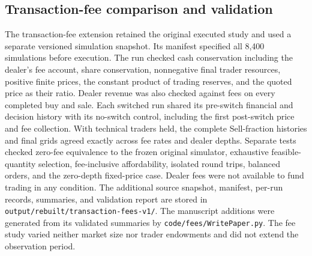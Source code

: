 \subsection{Transaction-fee comparison and validation}

The transaction-fee extension retained the original executed study and
used a separate versioned simulation snapshot. Its manifest specified all
8,400 simulations before execution. The run checked cash conservation
including the dealer's fee account, share conservation, nonnegative final
trader resources, positive finite prices, the constant product of trading
reserves, and the quoted price as their ratio. Dealer revenue was also checked
against fees on every completed buy and sale. Each switched run shared
its pre-switch financial and decision history with its no-switch control, including
the first post-switch price and fee collection. With technical traders
held, the complete Sell-fraction histories and final grids agreed exactly
across fee rates and dealer depths. Separate tests checked zero-fee equivalence to
the frozen original simulator, exhaustive feasible-quantity selection,
fee-inclusive affordability, isolated round trips, balanced orders, and
the zero-depth fixed-price case. Dealer fees were not available to fund
trading in any condition. The additional source snapshot, manifest,
per-run records, summaries, and validation report are stored in
\texttt{output/rebuilt/transaction-fees-v1/}. The manuscript additions
were generated from its validated summaries by
\texttt{code/fees/WritePaper.py}. The fee study varied neither market size
nor trader endowments and did not extend the observation period.
